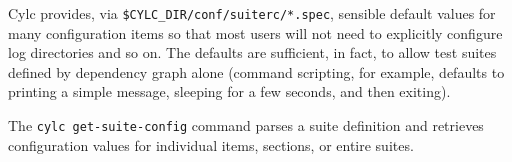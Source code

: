 Cylc provides, via \lstinline=$CYLC_DIR/conf/suiterc/*.spec=, sensible
default values for many configuration items so that most users will not
need to explicitly configure log directories and so on. The defaults are
sufficient, in fact, to allow test suites defined by dependency graph
alone (command scripting, for example, defaults to printing a simple
message, sleeping for a few seconds, and then exiting).

The \lstinline=cylc get-suite-config= command parses a suite definition and
retrieves configuration values for individual items, sections, or entire
suites.

